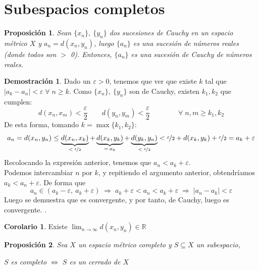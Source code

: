\documentclass[12pt,twoside]{report}
\theoremstyle{azul}
\theoremstyle{azul2}
\theoremstyle{plain}
\newtheorem*{prop}{Proposición}
\theoremstyle{definition}
\newtheorem*{dem}{Demostración}
\newtheorem*{cor}{Corolario}
\theoremstyle{remark}
\begin{document}
\section{Subespacios completos}
\begin{prop}
Sean $\{ x_n \},\: \{ y_n \} $ dos sucesiones de Cauchy en un espacio métrico $X$ y $a_n=d(x_n,y_n)$, luego $\{ a_n \}$ es una sucesión de n{\'u}meros reales (donde todos son $>$ 0). Entonces, $\{ a_n \}$ es una sucesión de Cauchy de n{\'u}meros reales.
\end{prop}
\begin{dem}
Dado un $\varepsilon > 0$, tenemos que ver que existe $k$ tal que $|a_k - a_n| < \varepsilon \; \forall \; n \geq k$. Como $\{ x_n \},\: \{ y_n \}$ son de Cauchy, existen $k_1,k_2$ que cumplen:
$$d(x_n,x_m) < \dfrac{\varepsilon}{2} \qquad d(y_n,y_m) < \dfrac{\varepsilon}{2} \qquad \qquad \forall \; n,m \geq k_1,k_2$$
De esta forma, tomando $k=\max\{k_1,k_2\}$:
$$a_n = d(x_n,y_n) \leq \underbrace{d(x_n,x_k)}_{< \: \nicefrac{\varepsilon}{2}} + \underbrace{d(x_k,y_k)}_{= \: a_k}+ \underbrace{d(y_k,y_n)}_{< \: \nicefrac{\varepsilon}{2}}< \nicefrac{\varepsilon}{2}+d(x_k,y_k)+\nicefrac{\varepsilon}{2}=a_k+\varepsilon$$
Recolocando la expresión anterior, tenemos que $\boxed{a_n < a_k + \varepsilon}$.\\  Podemos intercambiar $n$ por $k$, y repitiendo el argumento anterior, obtendríamos $\boxed{a_k < a_n + \varepsilon}$. De forma que $$a_n \in (a_k-\varepsilon, \: a_k+ \varepsilon) \; \Rightarrow \; a_k + \varepsilon < a_n < a_k + \varepsilon \; \Rightarrow \; |a_n - a_k | < \varepsilon$$
Luego se demuestra que es convergente, y por tanto, de Cauchy, luego es convergente. .
\end{dem}
\begin{cor}
    Existe $\displaystyle \lim_{n \to \infty}d(x_n,y_n) \in \mathbb{R}$    
\end{cor}
\begin{prop}Sea $X$ un espacio m{\'e}trico completo y $S \subseteq X$ un subespacio, \vspace{-5mm}
\begin{center}
    $S$ es completo $\Leftrightarrow$ $S$ es un cerrado de $X$
\end{center}
\end{prop}
\vspace{-5mm}
\end{document}
